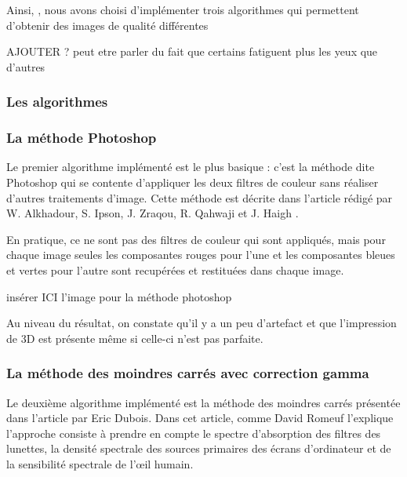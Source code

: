 	Ainsi, , nous avons choisi d'implémenter trois algorithmes qui permettent d'obtenir des images de qualité différentes 
	  
  AJOUTER ? peut etre parler du fait que certains fatiguent plus les yeux que d'autres
\subsubsection{Les algorithmes}

\subsubsection{La méthode Photoshop}
	Le premier algorithme implémenté est le plus basique : c'est la méthode dite Photoshop qui se contente d'appliquer les deux filtres de couleur sans réaliser d'autres traitements d'image. Cette méthode est décrite dans l'article rédigé par W. Alkhadour, S. Ipson, J. Zraqou, R. Qahwaji et J. Haigh \cite{steteroAnaglyph}.
		
	En pratique, ce ne sont pas des filtres de couleur qui sont appliqués, mais pour chaque image seules les composantes rouges pour l'une et les composantes bleues et vertes pour l'autre sont recupérées et restituées dans chaque image.
	
	 insérer ICI l'image pour la méthode photoshop

	Au niveau du résultat, on constate qu'il y a un peu d'artefact et que l'impression de 3D est présente même si celle-ci n'est pas parfaite.
\subsubsection{La méthode des moindres carrés avec correction gamma}
	Le deuxième algorithme implémenté est la méthode des moindres carrés présentée dans l'article \cite{algoDubois} par Eric Dubois. Dans cet article, comme David Romeuf l'explique \cite{explicationAlgoDubois} l'approche consiste à prendre en compte le spectre d'absorption des filtres des lunettes, la densité spectrale des sources primaires des écrans d'ordinateur et de la sensibilité spectrale de l'œil humain. 
	
